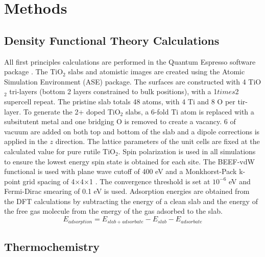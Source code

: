

\section{Methods}
\label{sec:methods}

\subsection{Density Functional Theory Calculations}
All first principles calculations are performed in the Quantum Espresso software package \cite{QE-2009}.
The TiO$_2$ slabs and atomistic images are created using the Atomic Simulation Environment (ASE) package\cite{Hjorth_Larsen_2017}. The surfaces are constructed with 4 TiO$_2$ tri-layers (bottom 2 layers constrained to bulk positions), with a 1$times$2 supercell repeat. The pristine slab totals 48 atoms, with 4 Ti and 8 O per tir-layer. To generate the 2+ doped TiO$_2$ slabs, a 6-fold Ti atom is replaced with a subsitutent metal and one bridging O is removed to create a vacancy. 6 \A{} of vacuum are added on both top and bottom of the slab and a dipole corrections is applied in the $z$ direction. The lattice parameters of the unit cells are fixed at the calculated value for pure rutile TiO$_2$. Spin polarization is used in all simulations to ensure the lowest energy spin state is obtained for each site. The BEEF-vdW functional \cite{Wellendorff_2012} is used with plane wave cutoff of 400 eV and a Monkhorst-Pack k-point grid spacing of 4$\times$4$\times$1 \cite{Monkhorst_1976}. The convergence threshold is set at $10^{-6}$ eV and Fermi-Dirac smearing of 0.1 eV is used. Adsorption energies are obtained from the DFT calculations by subtracting the energy of a clean slab and the energy of the free gas molecule from the energy of the gas adsorbed to the slab. 
\begin{equation}
E_{adsorption} = E_{slab+adsorbate} - E_{slab} - E_{adsorbate}
\end{equation}

\subsection{Thermochemistry}
\cite{ase-paper,Reuter_2005}


